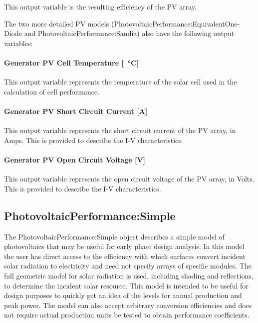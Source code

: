 This output variable is the resulting efficiency of the PV array.

The two more detailed PV models (PhotovoltaicPerformance:EquivalentOne-Diode and PhotovoltaicPerformance:Sandia) also have the following output variables:

\paragraph{Generator PV Cell Temperature {[}\SI{}{\celsius}{]}}\label{generator-pv-cell-temperature-c}

This output variable represents the temperature of the solar cell used in the calculation of cell performance.

\paragraph{Generator PV Short Circuit Current {[}A{]}}\label{generator-pv-short-circuit-current-a}

This output variable represents the short circuit current of the PV array, in Amps. This is provided to describe the I-V characteristics.

\paragraph{Generator PV Open Circuit Voltage {[}V{]}}\label{generator-pv-open-circuit-voltage-v}

This output variable represents the open circuit voltage of the PV array, in Volts. This is provided to describe the I-V characteristics.

\subsection{PhotovoltaicPerformance:Simple}\label{photovoltaicperformancesimple}

The PhotovoltaicPerformance:Simple object describes a simple model of photovoltaics that may be useful for early phase design analysis. In this model the user has direct access to the efficiency with which surfaces convert incident solar radiation to electricity and need not specify arrays of specific modules. The full geometric model for solar radiation is used, including shading and reflections, to determine the incident solar resource. This model is intended to be useful for design purposes to quickly get an idea of the levels for annual production and peak power. The model can also accept arbitrary conversion efficiencies and does not require actual production units be tested to obtain performance coefficients.

